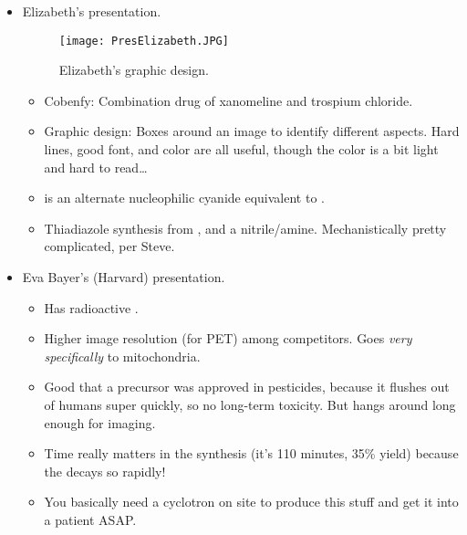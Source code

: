 \documentclass[../notes.tex]{subfiles}
\begin{document}
\begin{itemize}
    \item Elizabeth's presentation.
    \begin{figure}[H]
        \centering
        \texttt{[image: PresElizabeth.JPG]}
        \caption{Elizabeth's graphic design.}
        \label{fig:PresElizabeth}
    \end{figure}
    \begin{itemize}
        \item Cobenfy: Combination drug of xanomeline and trospium chloride.
        \item Graphic design: Boxes around an image to identify different aspects. Hard lines, good font, and color are all useful, though the color is a bit light and hard to read\dots
        \item {} is an alternate nucleophilic cyanide equivalent to .
        \item Thiadiazole synthesis from , and a nitrile/amine. Mechanistically pretty complicated, per Steve.
    \end{itemize}
    \item Eva Bayer's (Harvard) presentation.
    \begin{itemize}
        \item Has radioactive .
        \item Higher image resolution (for PET) among competitors. Goes \emph{very specifically} to mitochondria.
        \item Good that a precursor was approved in pesticides, because it flushes out of humans super quickly, so no long-term toxicity. But hangs around long enough for imaging.
        \item Time really matters in the synthesis (it's 110 minutes, 35\% yield) because the  decays so rapidly!
        \item You basically need a cyclotron on site to produce this stuff and get it into a patient ASAP.
    \end{itemize}
\end{itemize}
\end{document}
